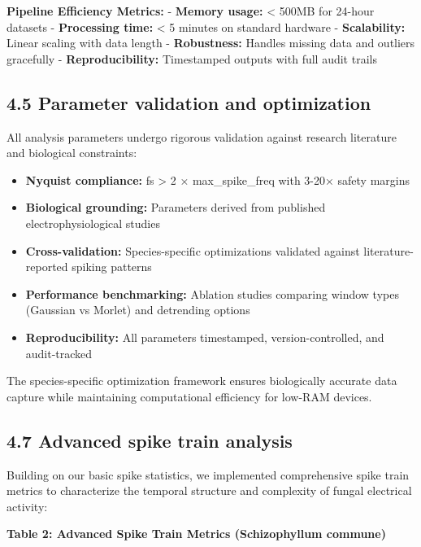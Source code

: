 \documentclass[
  11pt,
]{article}
\providecommand{\tightlist}{%
  \setlength{\itemsep}{0pt}\setlength{\parskip}{0pt}}
\begin{document}
\textbf{Pipeline Efficiency Metrics:} - \textbf{Memory usage:}
\textless{} 500MB for 24-hour datasets - \textbf{Processing time:}
\textless{} 5 minutes on standard hardware - \textbf{Scalability:}
Linear scaling with data length - \textbf{Robustness:} Handles missing
data and outliers gracefully - \textbf{Reproducibility:} Timestamped
outputs with full audit trails

\hypertarget{parameter-validation-and-optimization}{%
\subsection{4.5 Parameter validation and
optimization}\label{parameter-validation-and-optimization}}

All analysis parameters undergo rigorous validation against research
literature and biological constraints:

\begin{itemize}
\tightlist
\item
  \textbf{Nyquist compliance:} fs \textgreater{} 2 × max\_spike\_freq
  with 3-20× safety margins
\item
  \textbf{Biological grounding:} Parameters derived from published
  electrophysiological studies
\item
  \textbf{Cross-validation:} Species-specific optimizations validated
  against literature-reported spiking patterns
\item
  \textbf{Performance benchmarking:} Ablation studies comparing window
  types (Gaussian vs Morlet) and detrending options
\item
  \textbf{Reproducibility:} All parameters timestamped,
  version-controlled, and audit-tracked
\end{itemize}

The species-specific optimization framework ensures biologically
accurate data capture while maintaining computational efficiency for
low-RAM devices.

\hypertarget{advanced-spike-train-analysis}{%
\subsection{4.7 Advanced spike train
analysis}\label{advanced-spike-train-analysis}}

Building on our basic spike statistics, we implemented comprehensive
spike train metrics to characterize the temporal structure and
complexity of fungal electrical activity:

\textbf{Table 2: Advanced Spike Train Metrics (Schizophyllum commune)}
\end{document}
